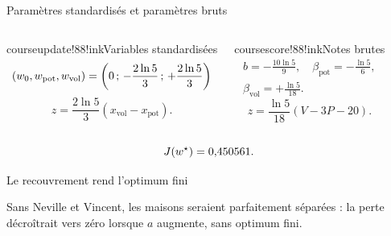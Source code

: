 \begin{frame}[t]{Paramètres standardisés et paramètres bruts}
  \begin{columns}[T,onlytextwidth]
      \begin{coursecallout}{courseupdate!88!ink}{Variables standardisées}
        \[
          (w_0,w_{\mathrm{pot}},w_{\mathrm{vol}})=\left(0\,;\,-\frac{2\ln 5}{3}\,;\,+\frac{2\ln 5}{3}\right)
        \]
        \[
          z=\frac{2\ln5}{3}
          (x_{\mathrm{vol}}-x_{\mathrm{pot}}).
        \]
      \end{coursecallout}
      \begin{coursecallout}{coursescore!88!ink}{Notes brutes}
        \[
          \begin{gathered}
            b=-\frac{10\ln5}{9},\quad
            \beta_{\mathrm{pot}}=-\frac{\ln5}{6},\\
            \beta_{\mathrm{vol}}=+\frac{\ln5}{18}.
          \end{gathered}
        \]
        \[
          \boxed{z=\frac{\ln5}{18}(V-3P-20).}
        \]
      \end{coursecallout}
  \end{columns}
  \vfill
  \[
    J(w^\star)=0{,}450561.
  \]
\end{frame}

\begin{frame}[t]{Le recouvrement rend l'optimum fini}
  \centering
  \begin{releve}
    Sans Neville et Vincent, les maisons seraient parfaitement séparées : la
    perte décroîtrait vers zéro lorsque \(a\) augmente, sans optimum fini.
  \end{releve}
\end{frame}

